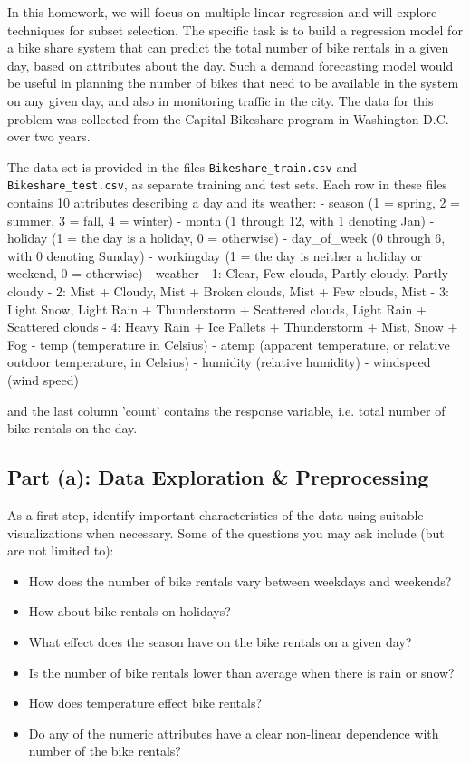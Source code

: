 \documentclass[11pt]{article}
\providecommand{\tightlist}{%
      \setlength{\itemsep}{0pt}\setlength{\parskip}{0pt}}
\begin{document}
In this homework, we will focus on multiple linear regression and will
explore techniques for subset selection. The specific task is to build a
regression model for a bike share system that can predict the total
number of bike rentals in a given day, based on attributes about the
day. Such a demand forecasting model would be useful in planning the
number of bikes that need to be available in the system on any given
day, and also in monitoring traffic in the city. The data for this
problem was collected from the Capital Bikeshare program in Washington
D.C. over two years.

The data set is provided in the files \texttt{Bikeshare\_train.csv} and
\texttt{Bikeshare\_test.csv}, as separate training and test sets. Each
row in these files contains 10 attributes describing a day and its
weather: - season (1 = spring, 2 = summer, 3 = fall, 4 = winter) - month
(1 through 12, with 1 denoting Jan) - holiday (1 = the day is a holiday,
0 = otherwise) - day\_of\_week (0 through 6, with 0 denoting Sunday) -
workingday (1 = the day is neither a holiday or weekend, 0 = otherwise)
- weather - 1: Clear, Few clouds, Partly cloudy, Partly cloudy - 2: Mist
+ Cloudy, Mist + Broken clouds, Mist + Few clouds, Mist - 3: Light Snow,
Light Rain + Thunderstorm + Scattered clouds, Light Rain + Scattered
clouds - 4: Heavy Rain + Ice Pallets + Thunderstorm + Mist, Snow + Fog -
temp (temperature in Celsius) - atemp (apparent temperature, or relative
outdoor temperature, in Celsius) - humidity (relative humidity) -
windspeed (wind speed)

and the last column 'count' contains the response variable, i.e. total
number of bike rentals on the day.

    \subsection{Part (a): Data Exploration \&
Preprocessing}\label{part-a-data-exploration-preprocessing}

As a first step, identify important characteristics of the data using
suitable visualizations when necessary. Some of the questions you may
ask include (but are not limited to):

\begin{itemize}
\tightlist
\item
  How does the number of bike rentals vary between weekdays and
  weekends?
\item
  How about bike rentals on holidays?
\item
  What effect does the season have on the bike rentals on a given day?
\item
  Is the number of bike rentals lower than average when there is rain or
  snow?
\item
  How does temperature effect bike rentals?
\item
  Do any of the numeric attributes have a clear non-linear dependence
  with number of the bike rentals?
\end{itemize}
\end{document}
